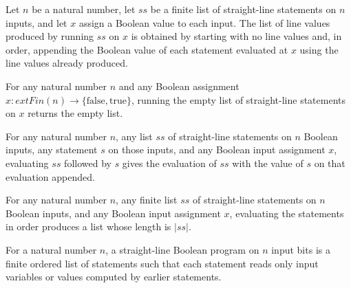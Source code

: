 \begin{definition}
\label{BoolCircuit.StraightLine.runLines}
\leanok
{}
Let $n$ be a natural number, let $ss$ be a finite list of straight-line statements on
$n$ inputs, and let $x$ assign a Boolean value to each input. The list of line values
produced by running $ss$ on $x$ is obtained by starting with no line values and, in
order, appending the Boolean value of each statement evaluated at $x$ using the line
values already produced.
\end{definition}

\begin{theorem}
\label{BoolCircuit.StraightLine.runLines_nil}
\leanok
{}
For any natural number $n$ and any Boolean assignment $x : 	ext{Fin}(n) \to
\{\mathrm{false},\mathrm{true}\}$, running the empty list of straight-line statements on
$x$ returns the empty list.
\end{theorem}

\begin{theorem}
\label{BoolCircuit.StraightLine.runLines_snoc}
\leanok
{}
For any natural number $n$, any list $ss$ of straight-line statements on $n$ Boolean
inputs, any statement $s$ on those inputs, and any Boolean input assignment $x$,
evaluating $ss$ followed by $s$ gives the evaluation of $ss$ with the value of $s$ on
that evaluation appended.
\end{theorem}

\begin{theorem}
\label{BoolCircuit.StraightLine.length_runLines}
\leanok
{}
For any natural number $n$, any finite list $ss$ of straight-line statements on $n$
Boolean inputs, and any Boolean input assignment $x$, evaluating the statements in order
produces a list whose length is $|ss|$.
\end{theorem}

\begin{definition}
\label{BoolCircuit.StraightLineProgram}
\leanok
{}
For a natural number $n$, a straight-line Boolean program on $n$ input bits is a finite
ordered list of statements such that each statement reads only input variables or values
computed by earlier statements.
\end{definition}

